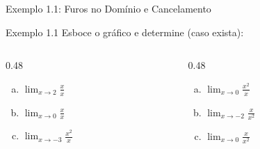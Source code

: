 \documentclass[10pt,aspectratio=169]{beamer}
\begin{document}
\begin{frame}{Exemplo 1.1: Furos no Domínio e Cancelamento}
    \transfade
    \begin{exampleblock}{Exemplo 1.1}
        Esboce o gráfico e determine (caso exista):
        \vspace{0.2cm}
        \begin{columns}[t]
            \begin{column}{0.48\textwidth}
                \begin{enumerate}[(a)]
                    \item $\lim_{x \to 2} \frac{x}{x}$
                    \vspace{0.2cm}\pause
                    \item $\lim_{x \to 0} \frac{x}{x}$
                    \vspace{0.2cm}\pause
                    \item $\lim_{x \to -3} \frac{x^2}{x}$
                \end{enumerate}
            \end{column}
            \begin{column}{0.48\textwidth}
                \begin{enumerate}[(d)]
                    \pause
                    \item $\lim_{x \to 0} \frac{x^2}{x}$
                    \vspace{0.2cm}\pause
                    \item $\lim_{x \to -2} \frac{x}{x^2}$
                    \vspace{0.2cm}\pause
                    \item $\lim_{x \to 0} \frac{x}{x^2}$
                \end{enumerate}
            \end{column}
        \end{columns}
    \end{exampleblock}
\end{frame}
\end{document}
